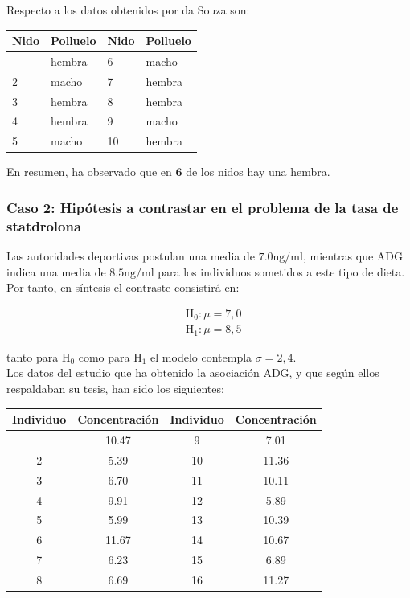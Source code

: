 \documentclass[
]{article}
\begin{document}
Respecto a los datos obtenidos por da Souza son:

\begin{longtable}[]{@{}llll@{}}
\toprule\noalign{}
Nido & Polluelo & Nido & Polluelo \\
\midrule\noalign{}
\endhead
\bottomrule\noalign{}
\endlastfoot
1 & hembra & 6 & macho \\
2 & macho & 7 & hembra \\
3 & hembra & 8 & hembra \\
4 & hembra & 9 & macho \\
5 & macho & 10 & hembra \\
\end{longtable}

En resumen, ha observado que en \(\mathbf{6}\) de los nidos hay una hembra.

\subsubsection{Caso 2: Hipótesis a contrastar en el problema de la tasa de statdrolona}\label{caso-2-hipuxf3tesis-a-contrastar-en-el-problema-de-la-tasa-de-statdrolona}

Las autoridades deportivas postulan una media de \(7.0 \mathrm{ng} / \mathrm{ml}\), mientras que ADG indica una media de \(8.5 \mathrm{ng} / \mathrm{ml}\) para los individuos sometidos a este tipo de dieta. Por tanto, en síntesis el contraste consistirá en:

\[
\begin{aligned}
& \mathrm{H}_{0}: \mu=7,0 \\
& \mathrm{H}_{1}: \mu=8,5
\end{aligned}
\]

tanto para \(\mathrm{H}_{0}\) como para \(\mathrm{H}_{1}\) el modelo contempla \(\sigma=2,4\).\\
Los datos del estudio que ha obtenido la asociación ADG, y que según ellos respaldaban su tesis, han sido los siguientes:

\begin{longtable}[]{@{}cccc@{}}
\toprule\noalign{}
Individuo & Concentración & Individuo & Concentración \\
\midrule\noalign{}
\endhead
\bottomrule\noalign{}
\endlastfoot
1 & 10.47 & 9 & 7.01 \\
2 & 5.39 & 10 & 11.36 \\
3 & 6.70 & 11 & 10.11 \\
4 & 9.91 & 12 & 5.89 \\
5 & 5.99 & 13 & 10.39 \\
6 & 11.67 & 14 & 10.67 \\
7 & 6.23 & 15 & 6.89 \\
8 & 6.69 & 16 & 11.27 \\
\end{longtable}
\end{document}
